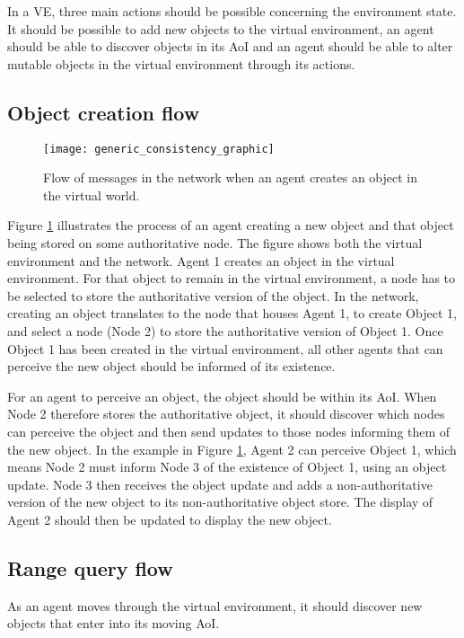 In a VE, three main actions should be possible concerning the environment state. It should be possible to add new objects to the virtual environment, an agent should be able to discover objects in its AoI and an agent should be able to alter mutable objects in the virtual environment through its actions.

\subsection{Object creation flow}

\begin{figure}[htbp]
 \centering
 \texttt{[image: generic\_consistency\_graphic]}
 \caption{Flow of messages in the network when an agent creates an object in the virtual world.}
 \label{fig_object_create_graphic}
\end{figure}
%
Figure \ref{fig_object_create_graphic} illustrates the process of an agent creating a new object and that object being stored on some authoritative node. The figure shows both the virtual environment and the network. Agent 1 creates an object in the virtual environment. For that object to remain in the virtual environment, a node has to be selected to store the authoritative version of the object. In the network, creating an object translates to the node that houses Agent 1, to create Object 1, and select a node (Node 2) to store the authoritative version of Object 1. Once Object 1 has been created in the virtual environment, all other agents that can perceive the new object should be informed of its existence.

For an agent to perceive an object, the object should be within its AoI. When Node 2 therefore stores the authoritative object, it should discover which nodes can perceive the object and then send updates to those nodes informing them of the new object. In the example in Figure \ref{fig_object_create_graphic}, Agent 2 can perceive Object 1, which means Node 2 must inform Node 3 of the existence of Object 1, using an object update. Node 3 then receives the object update and adds a non-authoritative version of the new object to its non-authoritative object store. The display of Agent 2 should then be updated to display the new object.

\subsection{Range query flow}
As an agent moves through the virtual environment, it should discover new objects that enter into its moving AoI.

